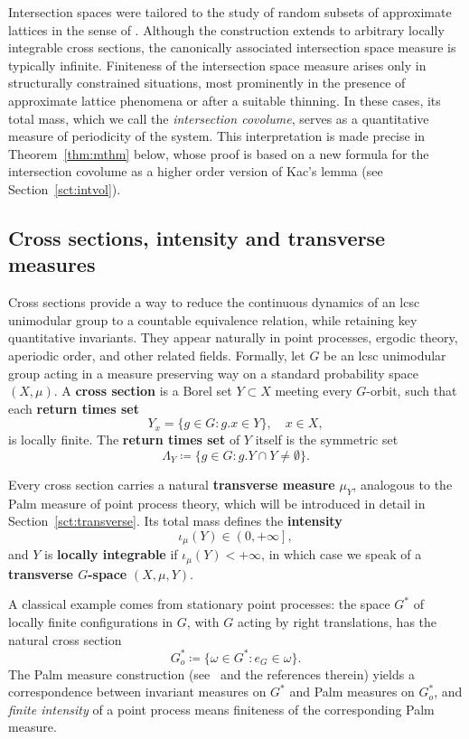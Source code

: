 \documentclass{amsart}
\numberwithin{equation}{subsection}
\theoremstyle{remark}
\begin{document}
\smallskip

Intersection spaces were tailored to the study of random subsets of approximate lattices in the sense of \cite{BjHa2018}. Although the construction extends to arbitrary locally integrable cross sections, the canonically associated intersection space measure is typically infinite. Finiteness of the intersection space measure arises only in structurally constrained situations, most prominently in the presence of approximate lattice phenomena or after a suitable thinning. In these cases, its total mass, which we call the \emph{intersection covolume}, serves as a quantitative measure of periodicity of the system. This interpretation is made precise in Theorem~\ref{thm:mthm} below, whose proof is based on a new formula for the intersection covolume as a higher order version of Kac's lemma (see Section~\ref{sct:intvol}).

\subsection{Cross sections, intensity and transverse measures}

Cross sections provide a way to reduce the continuous dynamics of an lcsc unimodular group to a countable equivalence relation, while retaining key quantitative invariants. They appear naturally in point processes, ergodic theory, aperiodic order, and other related fields. Formally, let \(G\) be an lcsc unimodular group acting in a measure preserving way on a standard probability space \(\left(X,\mu\right)\). A {\bf cross section} is a Borel set \(Y\subset X\) meeting every \(G\)-orbit, such that each {\bf return times set}
\[Y_{x}=\{g\in G : g.x\in Y\}, \quad x\in X,\]
is locally finite. The {\bf return times set} of \(Y\) itself is the symmetric set
\[\Lambda_{Y}\coloneqq\{g\in G:g.Y\cap Y\neq\emptyset\}.\]

Every cross section carries a natural {\bf transverse measure} \(\mu_{Y}\), analogous to the Palm measure of point process theory, which will be introduced in detail in Section~\ref{sct:transverse}. Its total mass defines the {\bf intensity}
\[\iota_{\mu}\left(Y\right)\in\left(0,+\infty\right],\]
and \(Y\) is {\bf locally integrable} if \(\iota_{\mu}\left(Y\right)<+\infty\), in which case we speak of a {\bf transverse \(G\)-space} \(\left(X,\mu,Y\right)\).

\smallskip

A classical example comes from stationary point processes: the space \(G^{\ast}\) of locally finite configurations in \(G\), with \(G\) acting by right translations, has the natural cross section
\[G_{o}^{\ast}\coloneqq\{\omega\in G^{\ast}:e_{G}\in\omega\}.\]
The Palm measure construction (see~\cite{last2009} and the references therein) yields a correspondence between invariant measures on \(G^{\ast}\) and Palm measures on \(G_{o}^{\ast}\), and {\em finite intensity} of a point process means finiteness of the corresponding Palm measure.
\end{document}
